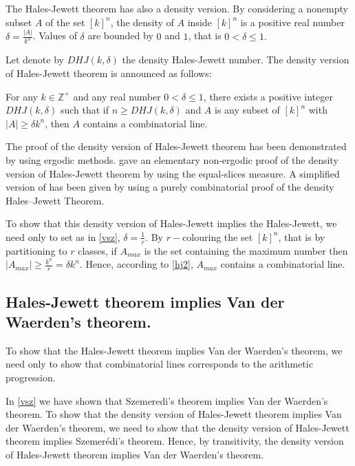 The Hales-Jewett theorem has also a density version. By considering a nonempty subset  $A$ of the set $[k]^n$, the density of $A$ inside $[k]^n$ is a positive real number $\delta=\frac{|A|}{k^n}$. Values of $\delta$ are bounded by $0$ and $1$, that is $0< \delta \leq 1.$ 

Let denote by $DHJ(k, \delta)$ the density Hales-Jewett number. The density version of Hales-Jewett theorem is announced as follows:

\begin{thm}   For any $k \in \mathbb{Z}^+$ and any real number $0< \delta \leq 1$,  there exists a positive integer $DHJ(k, \delta)$ such that if $n \geq DHJ(k,\delta)$ and $A$ is any subset of $[k] ^n$ with $|A| \geq \delta k^n$, then $A$ contains a combinatorial line.  \label{hj2}	\end{thm}

The proof of the density version of Hales-Jewett theorem has been demonstrated by \cite{furstenberg1991density} using ergodic methods. \cite{Polymath2009new} gave an elementary non-ergodic proof of the density version of Hales-Jewett theorem by using the equal-slices measure. A simplified version of \cite{Polymath2009new} has been given by \cite{dodos2013simple} using  a purely combinatorial proof of the density Hales–Jewett Theorem.

To show that this density version of Hales-Jewett implies the Hales-Jewett, we need only to set as in  \eqref{vsz}, $\delta=\frac{1}{r}.$ By $r-$colouring the set $[k]^n$, that is by partitioning to $r$ classes,  if $A_{max}$ is the set containing the maximum number then $|A_{max}| \geq \frac{k^n}{r}=\delta k^n.$ Hence, according to \eqref{hj2}, $A_{max}$ contains a combinatorial line.

\subsection{Hales-Jewett theorem implies Van der Waerden's theorem.}

To show that the Hales-Jewett theorem implies Van der Waerden's theorem, we need only to show that combinatorial lines corresponds to the arithmetic progression.

In \eqref{vsz} we have shown that Szemeredi's theorem implies Van der Waerden's theorem. To show that the density version of Hales-Jewett theorem implies Van der Waerden's theorem, we need to show that the density version of Hales-Jewett theorem implies Szemerédi's theorem. Hence, by transitivity, the density version of Hales-Jewett theorem implies Van der Waerden's theorem. 


